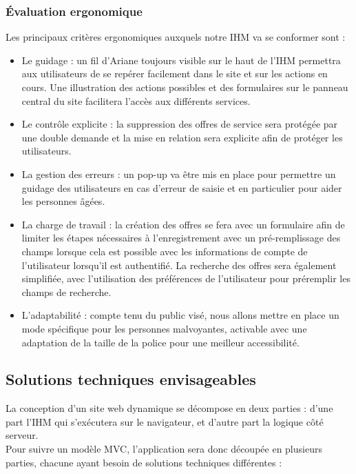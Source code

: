 \documentclass[a4paper,11pt]{article}
\begin{document}
\subsubsection{Évaluation ergonomique}

Les principaux critères ergonomiques auxquels notre IHM va se conformer sont :\\

\begin{itemize}
  \item Le guidage : un fil d’Ariane toujours visible sur le haut de l’IHM permettra aux utilisateurs de
  se repérer facilement dans le site et sur les actions en cours. Une illustration des actions
  possibles et des formulaires sur le panneau central du site facilitera l’accès aux différents
  services.
  \item Le contrôle explicite : la suppression des offres de service sera protégée par une double
  demande et la mise en relation sera explicite afin de protéger les utilisateurs.
  \item La gestion des erreurs : un pop-up va être mis en place pour permettre un guidage des
  utilisateurs en cas d’erreur de saisie et en particulier pour aider les personnes âgées.
  \item La charge de travail : la création des offres se fera avec un formulaire afin de limiter les étapes
  nécessaires à l’enregistrement avec un pré-remplissage des champs lorsque cela est possible
  avec les informations de compte de l’utilisateur lorsqu’il est authentifié. La recherche des
  offres sera également simplifiée, avec l’utilisation des préférences de l’utilisateur pour
  préremplir les champs de recherche.
  \item L’adaptabilité : compte tenu du public visé, nous allons mettre en place un mode spécifique
  pour les personnes malvoyantes, activable avec une adaptation de la taille de la police pour
  une meilleur accessibilité.
\end{itemize}

\subsection{Solutions techniques envisageables}

La conception d’un site web dynamique se décompose en deux parties : d’une part l’IHM qui
s’exécutera sur le navigateur, et d’autre part la logique côté serveur.\\

Pour suivre un modèle MVC, l’application sera donc découpée en plusieurs parties, chacune ayant
besoin de solutions techniques différentes :\\
\end{document}
